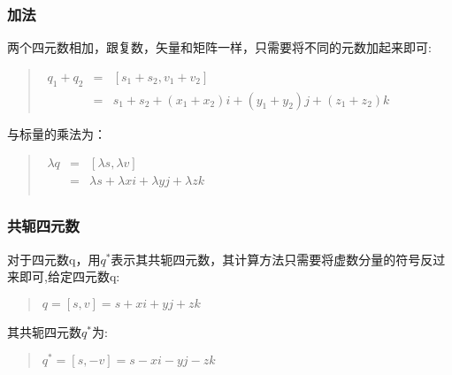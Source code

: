 \documentclass[a4paper,10pt]{article}
\begin{document}
\begin{CJK}{UTF8}{song}
\subsubsection{加法}
两个四元数相加，跟复数，矢量和矩阵一样，只需要将不同的元数加起来即可:
\begin{quote}
\begin{math}
\begin{array}{ccl}
q_{1}+q_{2} & = & [s_{1}+s_{2},v_{1}+v_{2}] \\
	    & =& s_{1}+s_{2}+(x_{1}+x_{2})i+(y_{1}+y_{2})j+(z_{1}+z_{2})k 
\end{array}
\end{math}
\end{quote}

与标量的乘法为：
\begin{quote}
$\begin{array}{ccl}
\lambda{}q&=&[\lambda{}s,\lambda{}v] \\
          &=&\lambda{}s+\lambda{}xi+\lambda{}yj+\lambda{}zk \\
\end{array}
$
\end{quote}

\subsubsection{共轭四元数}
对于四元数q，用$q^{*}$表示其共轭四元数，其计算方法只需要将虚数分量的符号反过来即可,给定四元数q:
\begin{quote}
$ q=[s,v]=s+xi+yj+zk $
\end{quote}
其共轭四元数$q^{*}$为:
\begin{quote}
$ q^{*}=[s,-v]=s-xi-yj-zk $
\end{quote}


\end{CJK}
\end{document}
